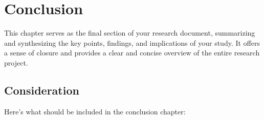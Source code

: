 \chapter{Conclusion}
\label{chapter:conclusion}

This  chapter serves as the final section of your research document, summarizing and synthesizing the key points, findings, and implications of your study. It offers a sense of closure and provides a clear and concise overview of the entire research project.



\section{Consideration}
Here's what should be included in the conclusion chapter:

